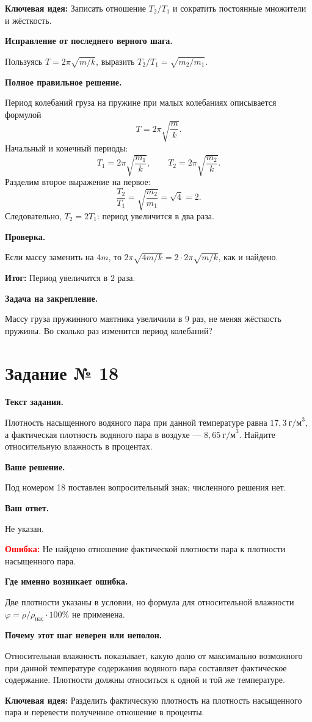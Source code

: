 \documentclass[11pt,a4paper]{article}
\newcommand{\reviewblock}[2]{\par\medskip\noindent\textbf{#1}\par\noindent#2\par}
\newcommand{\errorblock}[1]{\par\medskip\noindent\textcolor{red}{\textbf{Ошибка:}} #1\par}
\newcommand{\ideablock}[1]{\par\medskip\noindent\textcolor{blue!60!black}{\textbf{Ключевая идея:}} #1\par}
\newcommand{\resultblock}[1]{\par\medskip\noindent\textcolor{teal!60!black}{\textbf{Итог:}} #1\par}
\begin{document}
\ideablock{Записать отношение $T_2/T_1$ и сократить постоянные множители и жёсткость.}

\reviewblock{Исправление от последнего верного шага.}{Пользуясь $T=2\pi\sqrt{m/k}$, выразить $T_2/T_1=\sqrt{m_2/m_1}$.}

\reviewblock{Полное правильное решение.}{Период колебаний груза на пружине при малых колебаниях описывается формулой
\[T=2\pi\sqrt{\frac{m}{k}}.\]
Начальный и конечный периоды:
\[T_1=2\pi\sqrt{\frac{m_1}{k}},\qquad T_2=2\pi\sqrt{\frac{m_2}{k}}.\]
Разделим второе выражение на первое:
\[\frac{T_2}{T_1}=\sqrt{\frac{m_2}{m_1}}=\sqrt4=2.\]
Следовательно, $T_2=2T_1$: период увеличится в два раза.}

\reviewblock{Проверка.}{Если массу заменить на $4m$, то $2\pi\sqrt{4m/k}=2\cdot2\pi\sqrt{m/k}$, как и найдено.}

\resultblock{Период увеличится в $2$ раза.}

\reviewblock{Задача на закрепление.}{Массу груза пружинного маятника увеличили в $9$ раз, не меняя жёсткость пружины. Во сколько раз изменится период колебаний?}
\newpage
{}\label{task:18}

\section*{Задание № 18}

\reviewblock{Текст задания.}{Плотность насыщенного водяного пара при данной температуре равна $17{,}3\ \text{г/м}^3$, а фактическая плотность водяного пара в воздухе --- $8{,}65\ \text{г/м}^3$. Найдите относительную влажность в процентах.}

\reviewblock{Ваше решение.}{Под номером 18 поставлен вопросительный знак; численного решения нет.}

\reviewblock{Ваш ответ.}{Не указан.}

\errorblock{Не найдено отношение фактической плотности пара к плотности насыщенного пара.}

\reviewblock{Где именно возникает ошибка.}{Две плотности указаны в условии, но формула для относительной влажности $\varphi=\rho/\rho_{\text{нас}}\cdot100\%$ не применена.}

\reviewblock{Почему этот шаг неверен или неполон.}{Относительная влажность показывает, какую долю от максимально возможного при данной температуре содержания водяного пара составляет фактическое содержание. Плотности должны относиться к одной и той же температуре.}

\ideablock{Разделить фактическую плотность на плотность насыщенного пара и перевести полученное отношение в проценты.}
\end{document}
